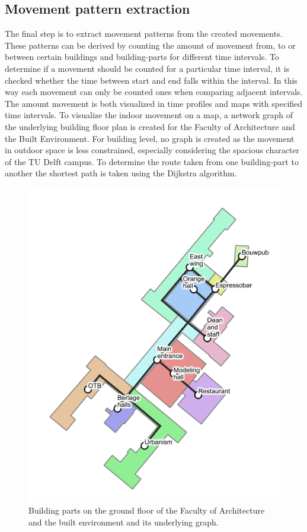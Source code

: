 \subsection{Movement pattern extraction}\label{ES-patternExtraction}
The final step is to extract movement patterns from the created movements. These patterns can be derived by counting the amount of movement from, to or between certain buildings and building-parts for different time intervals. To determine if a movement should be counted for a particular time interval, it is checked whether the time between start and end falls within the interval. In this way each movement can only be counted ones when comparing adjacent intervals. The amount movement is both visualized in time profiles and maps with specified time intervals. To visualize the indoor movement on a map, a network graph of the underlying building floor plan is created for the Faculty of Architecture and the Built Environment. For building level, no graph is created as the movement in outdoor space is less constrained, especially considering the spacious character of the TU Delft campus. To determine the route taken from one building-part to another the shortest path is taken using the Dijkstra algorithm.

\begin{figure}[H]
\centering
\includegraphics[scale=0.3]{bk_BG_bparts.png}
\captionsetup{justification=centering}
\caption{Building parts on the ground floor of the Faculty of Architecture and the built environment and
its underlying graph.}
\label{figure:ES-bk_graph}
\end{figure}